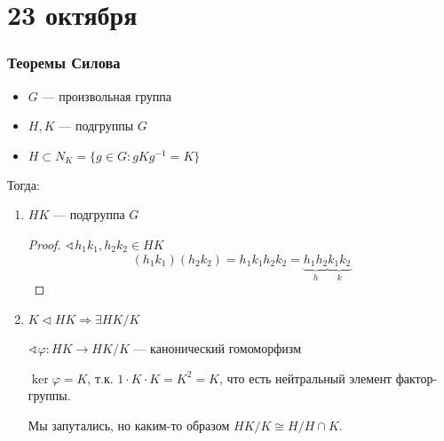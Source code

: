 \chapter{23 октября}

\subsection{Теоремы Силова}

\begin{remark}\itemfix
    \begin{itemize}
        \item \(G\) --- произвольная группа
        \item \(H, K\) --- подгруппы \(G\)
        \item \(H \subset N_K = \{g \in G : gKg^{-1} = K\}\)
    \end{itemize}

    Тогда:
    \begin{enumerate}
        \item \(HK\) --- подгруппа \(G\)
              \begin{proof}
                  \(\sphericalangle h_1k_1, h_2k_2 \in HK\)
                  \[(h_1k_1)(h_2k_2) = h_1k_1h_2k_2 = \underbrace{h_1h_2}_h\underbrace{k_1k_2}_k\]
              \end{proof}
        \item \(K \vartriangleleft HK \Rightarrow \exists HK / K\)

              \(\sphericalangle \varphi : HK \to HK / K\) --- канонический гомоморфизм

              \(\ker \varphi = K\), т.к. \(1 \cdot K \cdot K = K^2 = K\), что есть нейтральный элемент фактор-группы.

              Мы запутались, но каким-то образом \(HK / K \cong H / H \cap K\).

              \unfinished %
    \end{enumerate}
\end{remark}

